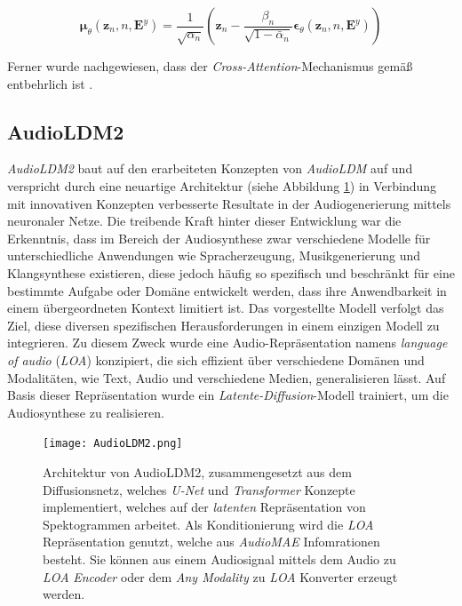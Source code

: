 \documentclass[
  a4paper,  %
  twoside,  %
  bibliography=totoc,
  headsepline,
  cleardoublepage=empty,
  parskip=half,
  draft=false
]{scrbook}
\begin{document}
\begin{equation}
    \boldsymbol{\mu}_\theta\left(\boldsymbol{z}_n, n, \boldsymbol{E}^y\right)=\frac{1}{\sqrt{\alpha_n}}\left(\boldsymbol{z}_n-\frac{\beta_n}{\sqrt{1-\bar{\alpha}_n}} \boldsymbol{\epsilon}_\theta\left(\boldsymbol{z}_n, n, \boldsymbol{E}^y\right)\right)
\end{equation}

Ferner wurde nachgewiesen, dass der \emph{Cross-Attention}-Mechanismus gemäß \cite{rombach_high-resolution_2022} entbehrlich ist \cite{liu_audioldm_2023}.

\subsection{AudioLDM2}

\emph{AudioLDM2} \cite{liu_audioldm2_2023} baut auf den erarbeiteten Konzepten von \emph{AudioLDM} \cite{liu_audioldm_2023} auf und verspricht durch eine neuartige Architektur (siehe Abbildung \ref{fig:AudioLDM2}) in Verbindung mit innovativen Konzepten verbesserte Resultate in der Audiogenerierung mittels neuronaler Netze. Die treibende Kraft hinter dieser Entwicklung war die Erkenntnis, dass im Bereich der Audiosynthese zwar verschiedene Modelle für unterschiedliche Anwendungen wie Spracherzeugung, Musikgenerierung und Klangsynthese existieren, diese jedoch häufig so spezifisch und beschränkt für eine bestimmte Aufgabe oder Domäne entwickelt werden, dass ihre Anwendbarkeit in einem übergeordneten Kontext limitiert ist. Das vorgestellte Modell verfolgt das Ziel, diese diversen spezifischen Herausforderungen in einem einzigen Modell zu integrieren. Zu diesem Zweck wurde eine Audio-Repräsentation namens \emph{language of audio} (\emph{LOA}) konzipiert, die sich effizient über verschiedene Domänen und Modalitäten, wie Text, Audio und verschiedene Medien, generalisieren lässt. Auf Basis dieser Repräsentation wurde ein \emph{Latente-Diffusion}-Modell trainiert, um die Audiosynthese zu realisieren. \cite{liu_audioldm2_2023}

\begin{figure}[h]
  \centering
  \texttt{[image: AudioLDM2.png]}
  \caption[AudioLDM2 Architektur]{Architektur von AudioLDM2, zusammengesetzt aus dem Diffusionsnetz, welches \emph{U-Net} und \emph{Transformer} Konzepte implementiert, welches auf der \emph{latenten} Repräsentation von Spektogrammen arbeitet. Als Konditionierung wird die \emph{LOA} Repräsentation genutzt, welche aus \emph{AudioMAE} Infomrationen besteht. Sie können aus einem Audiosignal mittels dem Audio zu \emph{LOA} \emph{Encoder} oder dem \emph{Any Modality} zu \emph{LOA} Konverter erzeugt werden. \cite{liu_audioldm2_2023}}
  \label{fig:AudioLDM2}
\end{figure} 
\end{document}
